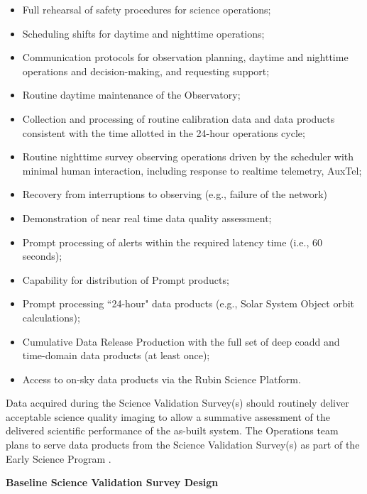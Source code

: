\begin{itemize}
\item Full rehearsal of safety procedures for science operations;
\item Scheduling shifts for daytime and nighttime operations;
\item Communication protocols for observation planning, daytime and nighttime operations and decision-making, and requesting support;
\item Routine daytime maintenance of the Observatory;
\item Collection and processing of routine calibration data and data products consistent with the time allotted in the 24-hour operations cycle;
\item Routine nighttime survey observing operations driven by the scheduler with minimal human interaction, including response to realtime telemetry, AuxTel;
\item Recovery from interruptions to observing (e.g., failure of the network)
\item Demonstration of near real time data quality assessment;
\item Prompt processing of alerts within the required latency time (i.e., 60 seconds);
\item Capability for distribution of Prompt products;
\item Prompt processing ``24-hour" data products (e.g., Solar System Object orbit calculations);
\item Cumulative Data Release Production with the full set of deep coadd and time-domain data products (at least once);
\item Access to on-sky data products via the Rubin Science Platform.
\end{itemize}

Data acquired during the Science Validation Survey(s) should routinely deliver acceptable science quality imaging to allow a summative assessment of the delivered scientific performance of the as-built system.
The Operations team plans to serve data products from the Science Validation Survey(s) as part of the Early Science Program .



\textbf{Baseline Science Validation Survey Design}

